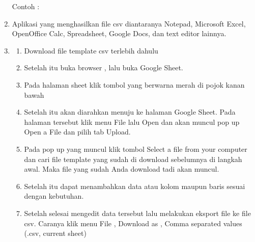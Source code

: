 \begin{enumerate}
Contoh :


\item
Aplikasi yang menghasilkan file csv diantaranya Notepad, Microsoft Excel, OpenOffice Calc, Spreadsheet, Google Docs, dan text editor lainnya.


\item
\begin{enumerate}
\item
Download file template csv terlebih dahulu
\item
Setelah itu buka browser , lalu buka Google Sheet.
\item
Pada halaman sheet klik tombol yang berwarna merah di pojok kanan bawah 
\item
Setelah itu akan diarahkan menuju ke halaman Google Sheet. Pada halaman tersebut klik menu File lalu Open dan akan muncul pop up Open a File dan pilih tab Upload.
\item
Pada pop up yang muncul klik tombol Select a file from your computer dan cari file template yang sudah di download sebelumnya di langkah awal. Maka file yang sudah Anda download tadi akan muncul.
\item
Setelah itu dapat menambahkan data atau kolom maupun baris sesuai dengan kebutuhan. 
\item
Setelah selesai mengedit data tersebut lalu melakukan eksport file ke file csv. Caranya klik menu File , Download as , Comma  separated values (.csv, current sheet)
\end{enumerate}


\end{enumerate}
